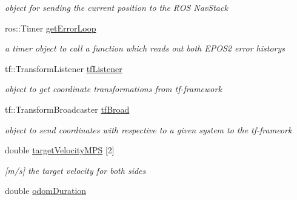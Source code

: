 \begin{DoxyCompactItemize}
\begin{DoxyCompactList}\small\item\em object for sending the current position to the R\-O\-S Nav\-Stack \end{DoxyCompactList}\item 
\hypertarget{structTankSteering_1_1tankSet_a729f2d8c93ceca1feee6dd6c7680e85a}{ros\-::\-Timer \hyperlink{structTankSteering_1_1tankSet_a729f2d8c93ceca1feee6dd6c7680e85a}{get\-Error\-Loop}}\label{structTankSteering_1_1tankSet_a729f2d8c93ceca1feee6dd6c7680e85a}

\begin{DoxyCompactList}\small\item\em a timer object to call a function which reads out both E\-P\-O\-S2 error historys \end{DoxyCompactList}\item 
\hypertarget{structTankSteering_1_1tankSet_a2df52ee5bd9169dad2bd8c70d054cf74}{tf\-::\-Transform\-Listener \hyperlink{structTankSteering_1_1tankSet_a2df52ee5bd9169dad2bd8c70d054cf74}{tf\-Listener}}\label{structTankSteering_1_1tankSet_a2df52ee5bd9169dad2bd8c70d054cf74}

\begin{DoxyCompactList}\small\item\em object to get coordinate transformations from tf-\/framework \end{DoxyCompactList}\item 
\hypertarget{structTankSteering_1_1tankSet_a24fcf593e4c92d8abfd5444e1206807b}{tf\-::\-Transform\-Broadcaster \hyperlink{structTankSteering_1_1tankSet_a24fcf593e4c92d8abfd5444e1206807b}{tf\-Broad}}\label{structTankSteering_1_1tankSet_a24fcf593e4c92d8abfd5444e1206807b}

\begin{DoxyCompactList}\small\item\em object to send coordinates with respective to a given system to the tf-\/frameork \end{DoxyCompactList}\item 
\hypertarget{structTankSteering_1_1tankSet_a21505f9f26ad6444c89d0795d35a5127}{double \hyperlink{structTankSteering_1_1tankSet_a21505f9f26ad6444c89d0795d35a5127}{target\-Velocity\-M\-P\-S} \mbox{[}2\mbox{]}}\label{structTankSteering_1_1tankSet_a21505f9f26ad6444c89d0795d35a5127}

\begin{DoxyCompactList}\small\item\em \mbox{[}m/s\mbox{]} the target velocity for both sides \end{DoxyCompactList}\item 
\hypertarget{structTankSteering_1_1tankSet_a9bef02225da9845d32bf5700ef132aba}{double \hyperlink{structTankSteering_1_1tankSet_a9bef02225da9845d32bf5700ef132aba}{odom\-Duration}}\label{structTankSteering_1_1tankSet_a9bef02225da9845d32bf5700ef132aba}


\end{DoxyCompactItemize}
